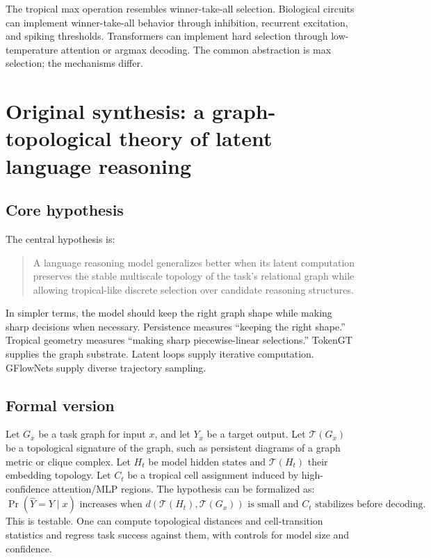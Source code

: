 \documentclass[11pt]{article}
\newcommand{\1}{\mathbf{1}}
\begin{document}
The tropical max operation resembles winner-take-all selection. Biological circuits can implement winner-take-all behavior through inhibition, recurrent excitation, and spiking thresholds. Transformers can implement hard selection through low-temperature attention or argmax decoding. The common abstraction is max selection; the mechanisms differ.

\section{Original synthesis: a graph-topological theory of latent language reasoning}

\subsection{Core hypothesis}

The central hypothesis is:

\begin{quote}
A language reasoning model generalizes better when its latent computation preserves the stable multiscale topology of the task's relational graph while allowing tropical-like discrete selection over candidate reasoning structures.
\end{quote}

In simpler terms, the model should keep the right graph shape while making sharp decisions when necessary. Persistence measures ``keeping the right shape.'' Tropical geometry measures ``making sharp piecewise-linear selections.'' TokenGT supplies the graph substrate. Latent loops supply iterative computation. GFlowNets supply diverse trajectory sampling.

\subsection{Formal version}

Let $G_x$ be a task graph for input $x$, and let $Y_x$ be a target output. Let $\mathcal{T}(G_x)$ be a topological signature of the graph, such as persistent diagrams of a graph metric or clique complex. Let $H_t$ be model hidden states and $\mathcal{T}(H_t)$ their embedding topology. Let $C_t$ be a tropical cell assignment induced by high-confidence attention/MLP regions. The hypothesis can be formalized as:
\[
\Pr(\hat Y=Y\mid x) \text{ increases when } d(\mathcal{T}(H_t),\mathcal{T}(G_x)) \text{ is small and } C_t \text{ stabilizes before decoding.}
\]
This is testable. One can compute topological distances and cell-transition statistics and regress task success against them, with controls for model size and confidence.
\end{document}
